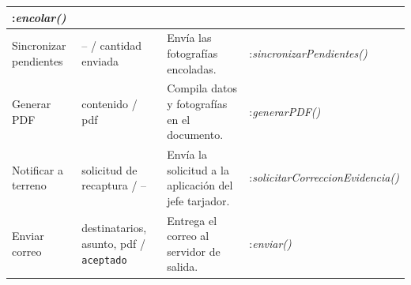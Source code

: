 {\begin{longtable}{|L{3.0cm}|L{3.2cm}|L{3.8cm}|L{4.6cm}|}
:\newline \textit{encolar()} \\ \hline
Sincronizar pendientes & -- / cantidad enviada & Envía las fotografías encoladas. &
:\newline \textit{sincronizarPendientes()} \\ \hline
Generar PDF & contenido / pdf & Compila datos y fotografías en el documento. &
:\newline \textit{generarPDF()} \\ \hline
Notificar a terreno & solicitud de recaptura / -- & Envía la solicitud a la aplicación
del jefe tarjador. & :\newline \textit{solicitarCorreccionEvidencia()} \\ \hline
Enviar correo & destinatarios, asunto, pdf / \texttt{aceptado} & Entrega el correo al
servidor de salida. & :\newline \textit{enviar()} \\ \hline
\end{longtable}
}
